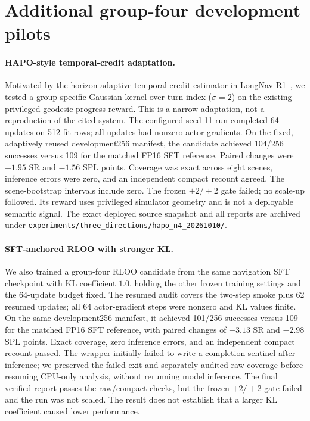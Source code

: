 \documentclass[10pt,twocolumn,letterpaper]{article}
\begin{document}
\section{Additional group-four development pilots}
\label{sec:additional-n4-pilots}
\paragraph{HAPO-style temporal-credit adaptation.} Motivated by the
horizon-adaptive temporal credit estimator in LongNav-R1~\cite{hu2026longnav},
we tested a group-specific Gaussian kernel over turn index ($\sigma=2$) on
the existing privileged geodesic-progress reward. This is a narrow adaptation,
not a reproduction of the cited system. The configured-seed-11 run completed
64 updates on 512 fit rows; all updates had nonzero actor gradients. On the
fixed, adaptively reused development256 manifest, the candidate achieved
104/256 successes versus 109 for the matched FP16 SFT reference. Paired changes
were $-1.95$ SR and $-1.56$ SPL points. Coverage was exact across eight scenes,
inference errors were zero, and an independent compact recount agreed. The
scene-bootstrap intervals include zero. The frozen $+2/+2$ gate failed; no
scale-up followed. Its reward uses privileged simulator geometry and is not a
deployable semantic signal. The exact deployed source snapshot and all reports
are archived under
\texttt{experiments/three\_directions/hapo\_n4\_20261010/}.

\paragraph{SFT-anchored RLOO with stronger KL.} We also trained a group-four
RLOO candidate from the same navigation SFT checkpoint with KL coefficient
$1.0$, holding the other frozen training settings and the 64-update budget
fixed. The resumed audit covers the two-step smoke plus 62 resumed updates;
all 64 actor-gradient steps were nonzero and KL values finite. On the same
development256 manifest, it achieved 101/256 successes versus 109 for the
matched FP16 SFT reference, with paired changes of $-3.13$ SR and $-2.98$ SPL
points. Exact coverage, zero inference errors, and an independent compact
recount passed. The wrapper initially failed to write a completion sentinel
after inference; we preserved the failed exit and separately audited raw
coverage before resuming CPU-only analysis, without rerunning model inference.
The final verified report passes the raw/compact checks, but the frozen
$+2/+2$ gate failed and the run was not scaled. The result does not establish
that a larger KL coefficient caused lower performance.
\end{document}
